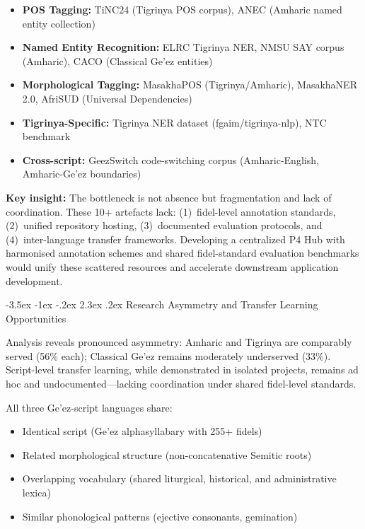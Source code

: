\documentclass[12pt,a4paper]{article}
\makeatletter
\theoremstyle{plain}
\theoremstyle{definition}
\renewcommand{\section}{\@startsection{section}{1}{\z@}%
  {-3.5ex \@plus -1ex \@minus -.2ex}%
  {2.3ex \@plus.2ex}%
  {\large\bfseries\color{NavyBlue}}}
\makeatother
\begin{document}
\begin{itemize}
    \item \textbf{POS Tagging:} TiNC24 (Tigrinya POS corpus), ANEC (Amharic named entity collection)
    \item \textbf{Named Entity Recognition:} ELRC Tigrinya NER, NMSU SAY corpus (Amharic), CACO (Classical Ge'ez entities)
    \item \textbf{Morphological Tagging:} MasakhaPOS (Tigrinya/Amharic), MasakhaNER 2.0, AfriSUD (Universal Dependencies)
    \item \textbf{Tigrinya-Specific:} Tigrinya NER dataset (fgaim/tigrinya-nlp), NTC benchmark
    \item \textbf{Cross-script:} GeezSwitch code-switching corpus (Amharic-English, Amharic-Ge'ez boundaries)
\end{itemize}

\textbf{Key insight:} The bottleneck is not absence but fragmentation and lack of coordination. These 10+ artefacts lack: (1)~fidel-level annotation standards, (2)~unified repository hosting, (3)~documented evaluation protocols, and (4)~inter-language transfer frameworks. Developing a centralized P4 Hub with harmonised annotation schemes and shared fidel-standard evaluation benchmarks would unify these scattered resources and accelerate downstream application development.


\section{Research Asymmetry and Transfer Learning Opportunities}

Analysis reveals pronounced asymmetry: Amharic and Tigrinya are comparably served (56\% each); Classical Ge'ez remains moderately underserved (33\%). Script-level transfer learning, while demonstrated in isolated projects, remains ad hoc and undocumented—lacking coordination under shared fidel-level standards.

All three Ge'ez-script languages share:

\begin{itemize}
    \item Identical script (Ge'ez alphasyllabary with 255+ fidels)
    \item Related morphological structure (non-concatenative Semitic roots)
    \item Overlapping vocabulary (shared liturgical, historical, and administrative lexica)
    \item Similar phonological patterns (ejective consonants, gemination)
\end{itemize}
\end{document}
